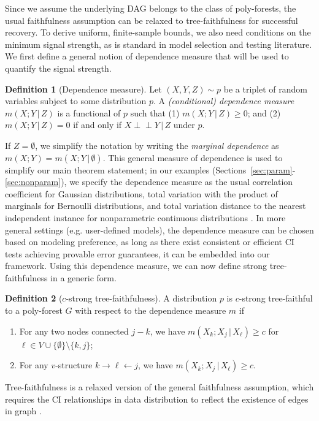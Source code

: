\documentclass{article}
\theoremstyle{definition}
\newtheorem{definition}{Definition}
\theoremstyle{definition}
\theoremstyle{definition}
\theoremstyle{definition}
\theoremstyle{definition}
\theoremstyle{definition}
\theoremstyle{remark}
\theoremstyle{remark}
\newcommand{\given}{\,|\,}
\newcommand{\indep}{\perp \!\!\! \perp }
\newcommand{\dpdm}{m}
\begin{document}
Since we assume the underlying DAG belongs to the class of poly-forests, the usual faithfulness assumption can be relaxed to tree-faithfulness \citep{wang2024optimal} for successful recovery.
To derive uniform, finite-sample bounds, we also need conditions on the minimum signal strength, as is standard in model selection and testing literature.
We first define a general notion of dependence measure that will be used to quantify the signal strength.
\begin{definition}[Dependence measure]\label{defn:dependence}
    Let $(X,Y,Z)\sim p$ be a triplet of random variables subject to some distribution $p$. A \emph{(conditional) dependence measure} $\dpdm(X;Y\given Z)$ is a functional of $p$ such that (1) $\dpdm(X;Y\given Z)\ge 0$; and (2) $\dpdm(X;Y\given Z)=0$ if and only if $X\indep Y\given Z$ under $p$.
\end{definition}
If $Z=\emptyset$, we simplify the notation by writing the \emph{marginal dependence} as $\dpdm(X;Y)=\dpdm(X;Y\given \emptyset)$.
This general measure of dependence is used to simplify our main theorem statement; in our examples (Sections~\ref{sec:param}-\ref{sec:nonparam}), we specify the dependence measure as the usual correlation coefficient for Gaussian distributions, total variation with the product of marginals for Bernoulli distributions, and total variation distance to the nearest independent instance for nonparametric continuous distributions \citep{canonne2018testing,neykov2021minimax,wang2024optimal}.
In more general settings (e.g. user-defined models), the dependence measure can be chosen based on modeling preference, as long as there exist consistent or efficient CI tests achieving provable error guarantees, it can be embedded into our framework.
Using this dependence measure, we can now define strong tree-faithfulness in a generic form.
\begin{definition}[$c$-strong tree-faithfulness]\label{defn:strongtreefaith}
A distribution $p$ is $c$-strong tree-faithful to a poly-forest $G$ with respect to the dependence measure $\dpdm$ if 
\begin{enumerate}
    \item For any two nodes connected $j-k$, we have $\dpdm(X_k; X_j\given X_\ell)\ge c$ for $\ell \in V\cup \{\emptyset\}\setminus \{k,j\}$;
    \item For any $v$-structure $k\rightarrow \ell\leftarrow j$, we have $\dpdm(X_k; X_j\given X_\ell)\ge c$.
\end{enumerate}
\end{definition}
Tree-faithfulness is a relaxed version of the general faithfulness assumption, which requires the CI relationships in data distribution to reflect the existence of edges in graph \citep{koller2009probabilistic,wang2024optimal}.
\end{document}
